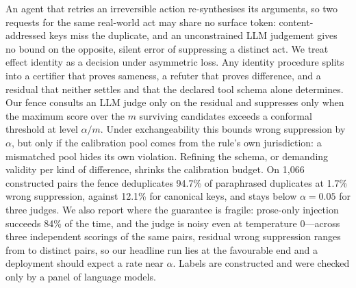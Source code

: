 An agent that retries an irreversible action re-synthesises its arguments, so two requests for the same real-world act may share no surface token: content-addressed keys miss the duplicate, and an unconstrained LLM judgement gives no bound on the opposite, silent error of suppressing a distinct act. We treat effect identity as a decision under asymmetric loss. Any identity procedure splits into a certifier that proves sameness, a refuter that proves difference, and a residual that neither settles and that the declared tool schema alone determines. Our fence consults an LLM judge only on the residual and suppresses only when the maximum score over the $m$ surviving candidates exceeds a conformal threshold at level $\alpha/m$. Under exchangeability this bounds wrong suppression by $\alpha$, but only if the calibration pool comes from the rule's own jurisdiction: a mismatched pool hides its own violation. Refining the schema, or demanding validity per kind of difference, shrinks the calibration budget. On 1,066 constructed pairs the fence deduplicates 94.7\% of paraphrased duplicates at 1.7\% wrong suppression, against 12.1\% for canonical keys, and stays below $\alpha=0.05$ for three judges. We also report where the guarantee is fragile: prose-only injection succeeds 84\% of the time, and the judge is noisy even at temperature 0---across three independent scorings of the same pairs, residual wrong suppression ranges from \stabMPWSCount{} to \stabMTWSCount{} distinct pairs, so our headline run lies at the favourable end and a deployment should expect a rate near $\alpha$. Labels are constructed and were checked only by a panel of language models.
